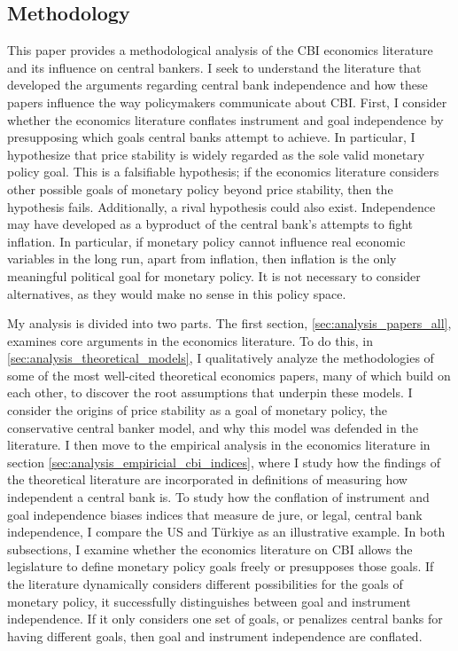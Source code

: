 \documentclass[12pt,a4paper]{article}
\begin{document}
\begin{doublespace}
\section{Methodology}
\label{sec:methodology}

This paper provides a methodological analysis of the CBI economics literature and its influence on central bankers. I seek to understand the literature that developed the arguments regarding central bank independence and how these papers influence the way policymakers communicate about CBI. First, I consider whether the economics literature conflates instrument and goal independence by presupposing which goals central banks attempt to achieve. In particular, I hypothesize that price stability is widely regarded as the sole valid monetary policy goal. This is a falsifiable hypothesis; if the economics literature considers other possible goals of monetary policy beyond price stability, then the hypothesis fails. Additionally, a rival hypothesis could also exist. Independence may have developed as a byproduct of the central bank's attempts to fight inflation. In particular, if monetary policy cannot influence real economic variables in the long run, apart from inflation, then inflation is the only meaningful political goal for monetary policy. It is not necessary to consider alternatives, as they would make no sense in this policy space.

My analysis is divided into two parts. The first section, \ref{sec:analysis_papers_all}, examines core arguments in the economics literature. To do this, in \ref{sec:analysis_theoretical_models}, I qualitatively analyze the methodologies of some of the most well-cited theoretical economics papers, many of which build on each other, to discover the root assumptions that underpin these models. I consider the origins of price stability as a goal of monetary policy, the conservative central banker model, and why this model was defended in the literature. I then move to the empirical analysis in the economics literature in section \ref{sec:analysis_empiricial_cbi_indices}, where I study how the findings of the theoretical literature are incorporated in definitions of measuring how independent a central bank is. To study how the conflation of instrument and goal independence biases indices that measure de jure, or legal, central bank independence, I compare the US and T\"urkiye as an illustrative example. In both subsections, I examine whether the economics literature on CBI allows the legislature to define monetary policy goals freely or presupposes those goals. If the literature dynamically considers different possibilities for the goals of monetary policy, it successfully distinguishes between goal and instrument independence. If it only considers one set of goals, or penalizes central banks for having different goals, then goal and instrument independence are conflated.


\end{doublespace}
\end{document}
